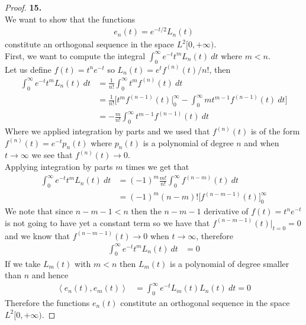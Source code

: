 \documentclass[11pt]{article}
\newcommand{\inprd}[1]{\left\langle{#1}\right\rangle}
\theoremstyle{definition}
\begin{document}
\cleardoublepage
\begin{proof}{\textbf{15.}}\\
We want to show that the functions 
\begin{align*}
    e_n(t) = e^{-t/2}L_n(t)
\end{align*}
constitute an orthogonal sequence in the space $L^2[0, +\infty)$.\\
First, we want to compute the integral $\int_0^\infty e^{-t}t^m L_n(t)~dt$
where $m < n$.\\
Let us define $f(t) = t^ne^{-t}$ so $L_n(t) = e^tf^{(n)}(t)/n!$, then
\begin{align*}
    \int_0^\infty e^{-t}t^m L_n(t)~dt
    &= \frac{1}{n!}\int_0^\infty t^m f^{(n)}(t)~dt \\
    &= \frac{1}{n!}\bigg[
        t^mf^{(n-1)}(t) \bigg|_0^\infty
        - \int_0^\infty mt^{m-1} f^{(n-1)}(t)~dt
    \bigg]\\
    &= -\frac{m}{n!}\int_0^\infty t^{m-1} f^{(n-1)}(t)~dt
\end{align*}
Where we applied integration by parts and we used that $f^{(n)}(t)$ is of the
form $f^{(n)}(t) = e^{-t} p_n(t)$ where $p_n(t)$ is a polynomial of degree $n$
and when $t \to \infty $ we see that $f^{(n)}(t) \to 0$.\\
Applying integration by parts $m$ times we get that
\begin{align*}
    \int_0^\infty e^{-t}t^m L_n(t)~dt
    &= (-1)^m\frac{m!}{n!}\int_0^\infty f^{(n-m)}(t)~dt\\
    &= (-1)^m(n - m)! \bigg[f^{(n-m-1)}(t)\bigg]_{0}^\infty
\end{align*}
We note that since $n - m - 1 < n$ then the $n-m-1$ derivative of
$f(t) = t^ne^{-t}$ is not going to have yet a constant term so we have
that $f^{(n-m-1)}(t)|_{t=0} = 0$ and we know that $f^{(n-m-1)}(t) \to 0$
when $t \to \infty$, therefore
\begin{align*}
    \int_0^\infty e^{-t}t^m L_n(t)~dt &= 0
\end{align*}
If we take $L_m(t)$ with $m < n$ then $L_m(t)$ is a polynomial of degree
smaller than $n$ and hence
\begin{align*}
    \inprd{e_n(t), e_m(t)} &= \int_0^\infty e^{-t}L_{m}(t) L_n(t)~dt = 0
\end{align*}
Therefore the functions $e_n(t)$ constitute an orthogonal sequence in the space
$L^2[0,+\infty)$.
\end{proof}

\cleardoublepage
\end{document}

